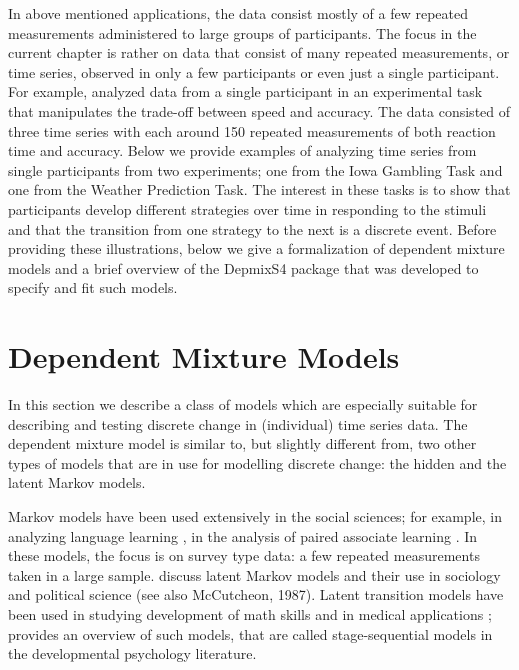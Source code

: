 \documentclass[a4paper,12pt,man,english]{apa} %
\newcommand{\citep}{\cite}
\newcommand{\citet}{\citeA}
\begin{document}
In above mentioned applications, the data consist mostly of a few
repeated measurements administered to large groups of participants.
The focus in the current chapter is rather on data that consist of
many repeated measurements, or time series, observed in only a few
participants or even just a single participant.  For example,
\citet{Visser2009} analyzed data from a single participant in an
experimental task that manipulates the trade-off between speed and
accuracy.  The data consisted of three time series with each around
150 repeated measurements of both reaction time and accuracy.  Below
we provide examples of analyzing time series from single participants
from two experiments; one from the Iowa Gambling Task and one from the
Weather Prediction Task.  The interest in these tasks is to show that
participants develop different strategies over time in responding to
the stimuli and that the transition from one strategy to the next is a
discrete event.  Before providing these illustrations, below we give a
formalization of dependent mixture models and a brief overview of the
DepmixS4 package that was developed to specify and fit such models.


\section{Dependent Mixture Models}

In this section we describe a class of models which are especially
suitable for describing and testing discrete change in (individual)
time series data.  The dependent mixture model is similar to, but
slightly different from, two other types of models that are in use for
modelling discrete change: the hidden and the latent Markov models.

Markov models have been used extensively in the social sciences; for
example, in analyzing language learning \cite{Miller1952,Miller1963},
in the analysis of paired associate learning \cite{Wickens1982}.  In
these models, the focus is on survey type data: a few repeated
measurements taken in a large sample.   discuss
latent Markov models and their use in sociology and political science
(see also McCutcheon, 1987).  Latent transition models have been used
in studying development of math skills \citep{Collins1992} and in
medical applications \citep{Reboussin1998}; \citet{Kaplan2008}
provides an overview of such models, that are called stage-sequential
models in the developmental psychology literature.
\end{document}
